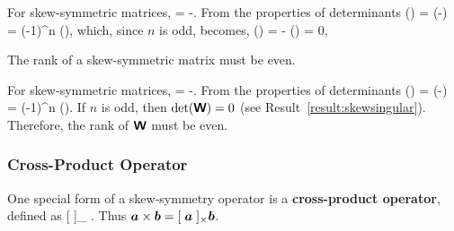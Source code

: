 \begin{Hproof}
For skew-symmetric matrices, 
\be
\tWbold = -\tWbold\transpose.
\ee
From the properties of determinants
\be
\det(\tWbold) = \det(-\tWbold\transpose) = (-1)^n \det(\tWbold),
\ee
which, since $n$ is odd, becomes,
\be
\det(\tWbold) = - \det(\tWbold) = 0,
\ee
\end{Hproof}

\begin{Hresult}
The rank of a skew-symmetric matrix must be even.
\end{Hresult}

\begin{Hproof}
For skew-symmetric matrices, 
\be
\tWbold = -\tWbold\transpose.
\ee
From the properties of determinants
\be
\det(\tWbold) = \det(-\tWbold\transpose) = (-1)^n \det(\tWbold).
\ee
If $n$ is odd, then $\det(\mbox{\sffamily\bfseries W}) = 0$ (see 
Result~\ref{result:skewsingular}).  Therefore, the 
rank of $\mbox{\sffamily\bfseries W}$ must be even.
\end{Hproof}

\subsubsection{Cross-Product Operator}
One special form of a skew-symmetry operator is a 
{\bf cross-product operator}, defined as
\be
\label{eq:cross_operator}
[\; \va \;]_{\times} 
{}.
\ee
Thus $\mbox{\boldmath $a$} \times \mbox{\boldmath $b$} = [ \; \mbox{\boldmath $a$} \;]_{\times} \mbox{\boldmath $b$}$.

